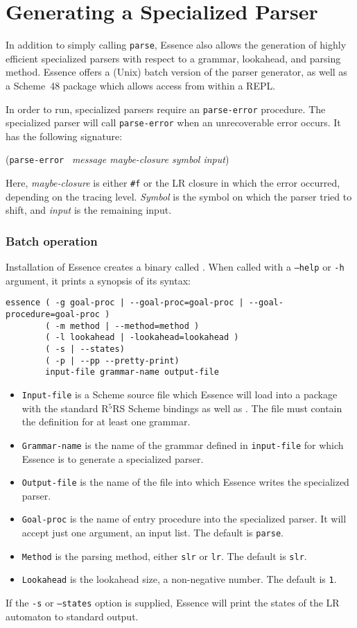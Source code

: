 \documentclass{article}
\renewcommand{\var}[1]{\noindent\mbox{\textit{#1}}}
\newcommand{\pproto}[2]{\unskip%
\mbox{\texonly{\spaceskip=0.5em}#1}%
\mbox{ }\texonly{\nobreak}\htmlonly{ }\textrm{#2}}
\newcommand{\proto}[3]{\par\bigskip\begin{flushleft}\pproto{(\texttt{#1}}{\textit{#2})}\hspace*{\fill}{#3}\end{flushleft}}
\newcommand{\codefont}[1]{\texttt{#1}}
\begin{document}
\section{Generating a Specialized Parser}
\label{sec:parser-generation}

In addition to simply calling \codefont{parse}, Essence also allows
the generation of highly efficient specialized parsers with respect to
a grammar, lookahead, and parsing method.  Essence offers a (Unix)
batch version of the parser generator, as well as a Scheme~48 package
which allows access from within a REPL.

In order to run, specialized parsers require an \codefont{parse-error}
procedure.  The specialized parser will call \codefont{parse-error} when an
unrecoverable error occurs.  It has the following signature:

\proto{parse-error}{message maybe-closure symbol input}{procedure}
%
Here, \var{maybe-closure} is either \verb|#f| or the LR closure in
which the error occurred, depending on the tracing level.
\var{Symbol} is the symbol on which the parser tried to shift, and
\var{input} is the remaining input.

\subsubsection*{Batch operation}
Installation of Essence creates a binary called .
When called with a \codefont{--help} or \codefont{-h} argument, it
prints a synopsis of its syntax:
%
\begin{verbatim}
essence ( -g goal-proc | --goal-proc=goal-proc | --goal-procedure=goal-proc )
        ( -m method | --method=method )
        ( -l lookahead | -lookahead=lookahead )
        ( -s | --states)
        ( -p | --pp --pretty-print)
        input-file grammar-name output-file
\end{verbatim}
%
\begin{itemize}
\item \texttt{Input-file} is a Scheme source file which Essence will
  load into a package with the standard R$^5$RS Scheme bindings as
  well as \link{\codefont{define-grammar}}{form:define-grammar}.  The
  file must contain the definition for at least one grammar.
\item \texttt{Grammar-name} is the name of the grammar defined in
  \texttt{input-file} for which Essence is to generate a specialized
  parser.
\item \texttt{Output-file} is the name of the file into which Essence
  writes the specialized parser.
\item \texttt{Goal-proc} is the name of entry procedure into the
  specialized parser.  It will accept just one argument, an input
  list.  The default is \texttt{parse}.
\item \texttt{Method} is the parsing method, either \texttt{slr} or
  \texttt{lr}.  The default is \texttt{slr}.
\item \texttt{Lookahead} is the lookahead size, a non-negative
  number.  The default is \texttt{1}.
\end{itemize}
%
If the \texttt{-s} or \texttt{--states} option is supplied, Essence
will print the states of the LR automaton to standard output.
\end{document}
